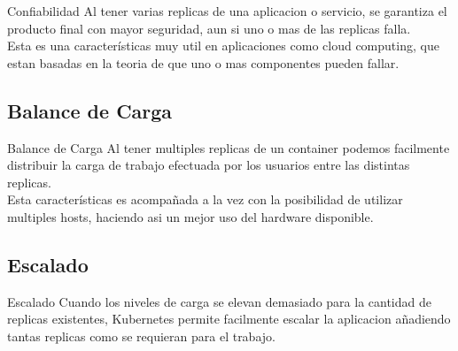 \documentclass{beamer}
\begin{document}
\begin{frame}{Confiabilidad}
	Al tener varias replicas de una aplicacion o servicio, se garantiza el producto final con mayor seguridad, aun si uno o mas de las replicas falla. \\
	\vspace{.3cm}
	Esta es una características muy util en aplicaciones como cloud computing, que estan basadas en la teoria de que uno o mas componentes pueden fallar.
\end{frame}


\subsection{Balance de Carga}

\begin{frame}{Balance de Carga}
	Al tener multiples replicas de un container podemos facilmente distribuir la carga de trabajo efectuada por los usuarios entre las distintas replicas. \\
	\vspace{.3cm}
	Esta características es acompañada a la vez con la posibilidad de utilizar multiples hosts, haciendo asi un mejor uso del hardware disponible.
\end{frame}


\subsection{Escalado}

\begin{frame}{Escalado}
	\hspace{.3cm}Cuando los niveles de carga se elevan demasiado para la cantidad de replicas existentes, Kubernetes permite facilmente escalar la aplicacion
	añadiendo tantas replicas como se requieran para el trabajo.
\end{frame}
\end{document}
